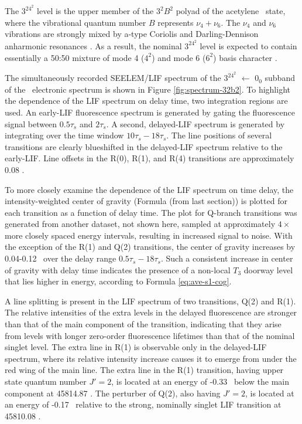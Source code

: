 The $3^24^2$ level is the upper member of the $3^2B^2$ polyad of the
acetylene \astate\ state, where the vibrational quantum number $B$
represents $\nu_4 + \nu_6$.  The $\nu_4$ and $\nu_6$ vibrations are
strongly mixed by a-type Coriolis and Darling-Dennison anharmonic
resonances \cite{merer08}.  As a result, the nominal $3^24^2$ level is
expected to contain essentially a 50:50 mixture of mode 4 ($4^2$) and
mode 6 ($6^2$) basis character \cite{merer08, virgo07}.

The simultaneously recorded SEELEM/LIF spectrum of the $3^24^2$ 
$\leftarrow$ $0_0$ subband of the \AtoX\ electronic spectrum is shown
in Figure \ref{fig:spectrum-32b2}. To highlight the dependence of the
LIF spectrum on delay time, two integration regions are used.  An
early-LIF fluorescence spectrum is generated by gating the
fluorescence signal between $0.5\tau_s$ and $2\tau_s$.  A second,
delayed-LIF spectrum is generated by integrating over the time window
$10\tau_s-18\tau_s$.  The line positions of several transitions are
clearly blueshifted in the delayed-LIF spectrum relative to the
early-LIF.  Line offsets in the R(0), R(1), and R(4) transitions are
approximately 0.08 \rcm.

To more closely examine the dependence of the LIF spectrum on time
delay, the intensity-weighted center of gravity (Formula (from last
section)) is plotted for each transition as a function of delay time.
The plot for Q-branch transitions was generated from another dataset,
not shown here, sampled at approximately $4 \times$ more closely
spaced energy intervals, resulting in increased signal to noise.  With
the exception of the R(1) and Q(2) transitions, the center of gravity
increases by 0.04-0.12 \rcm\ over the delay range
$0.5\tau_s-18\tau_s$.  Such a consistent increase in center of gravity
with delay time indicates the presence of a non-local $T_3$ doorway
level that lies higher in energy, according to Formula
\ref{eq:ave-s1-cog}.


A line splitting is present in the LIF spectrum of two transitions,
Q(2) and R(1).  The relative intensities of the extra levels in the
delayed fluorescence are stronger than that of the main component of
the transition, indicating that they arise from levels with longer
zero-order fluorescence lifetimes than that of the nominal singlet
level.  The extra line in R(1) is observable only in the delayed-LIF
spectrum, where its relative intensity increase causes it to emerge
from under the red wing of the main line.  The extra line in the R(1)
transition, having upper state quantum number $J'=2$, is located at an
energy of -0.33 \rcm\ below the main component at 45814.87 \rcm.  The
perturber of Q(2), also having $J'=2$, is located at an energy of
-0.17 \rcm\ relative to the strong, nominally singlet LIF transition
at 45810.08 \rcm.

